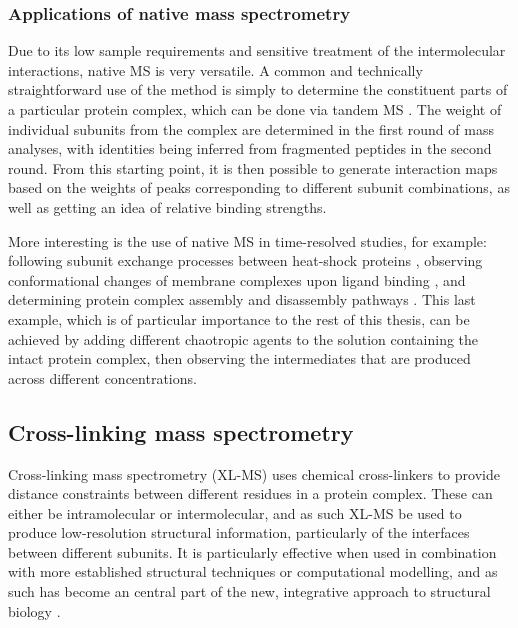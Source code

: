 \documentclass[a4paper,11pt,twoside,openright]{scrbook}
\begin{document}
\subsubsection{Applications of native mass spectrometry}
Due to its low sample requirements and sensitive treatment of the intermolecular interactions, native MS is very versatile. A common and technically straightforward use of the method is simply to determine the constituent parts of a particular protein complex, which can be done via tandem MS \cite{Sobott2002,Hernandez2007}. The weight of individual subunits from the complex are determined in the first round of mass analyses, with identities being inferred from fragmented peptides in the second round. From this starting point, it is then possible to generate interaction maps based on the weights of peaks corresponding to different subunit combinations, as well as getting an idea of relative binding strengths.

More interesting is the use of native MS in time-resolved studies, for example: following subunit exchange processes between heat-shock proteins \cite{Sobott2002a}, observing conformational changes of membrane complexes upon ligand binding \cite{Laganowsky2014}, and determining protein complex assembly and disassembly pathways \cite{Levy2008}. This last example, which is of particular importance to the rest of this thesis, can be achieved by adding different chaotropic agents to the solution containing the intact protein complex, then observing the intermediates that are produced across different concentrations.

\subsection{Cross-linking mass spectrometry}
Cross-linking mass spectrometry (XL-MS) uses chemical cross-linkers to provide distance constraints between different residues in a protein complex. These can either be intramolecular or intermolecular, and as such XL-MS be used to produce low-resolution structural information, particularly of the interfaces between different subunits. It is particularly effective when used in combination with more established structural techniques or computational modelling, and as such has become an central part of the new, integrative approach to structural biology \cite{Stengel2012,Ward2013,VandenBedem2015}.
\end{document}
